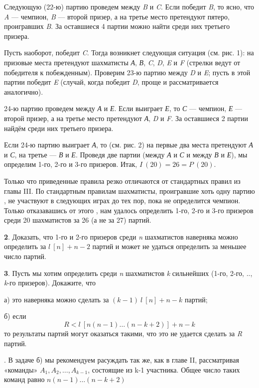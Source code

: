 \begin{paracol}{2}
{Следующую (22-ю) партию проведем между \textit{B} и \textit{C}. Если победит \textit{B}, то ясно, что \textit{A} --- чемпион, \textit{B} --- второй призер, а на третье место претендуют пятеро, проигравших \textit{B}. За оставшиеся 4 партии можно найти среди них третьего призера. 

\switchcolumn

Пусть наоборот, победит \textit{C}. Тогда возникнет следующая ситуация (см. рис. 1): на призовые места претендуют шахматисты \textit{А}, \textit{В}, \textit{C}, \textit{D}, \textit{E} и \textit{F} (стрелки ведут от победителя к побежденным). Проверим 23-ю партию между \textit{D} и \textit{E}; пусть в этой партии победит \textit{E} (случай, когда победит \textit{D}, проще и рассматривается аналогично).

24-ю партию проведем между \textit{А} и \textit{Е}. Если выиграет \textit{Е}, то \textit{С} --- чемпион, \textit{Е} --- второй призер, а на третье место претендуют \textit{А}, \textit{D} и \textit{F}. За оставшиеся 2 партии найдём среди них третьего призера.

Если 24-ю партию выиграет \textit{А}, то (см. рис. 2) на первые два места претендуют \textit{А} и \textit{С}, на третье --- \textit{В} и \textit{Е}. Проведя две партии (между \textit{А} и \textit{С} и между \textit{В} и \textit{Е}), мы определим 1-го, 2-го и 3-го призеров. Итак, $I \ (20)=26=P \ (20)$.

Только что приведенные правила резко отличаются от стандартных правил из главы III. По стандартным правилам шахматисты, проигравшие хоть одну партию , не участвуют в следующих играх до тех пор, пока не определится чемпион. Только отказавашись от этого , нам удалось определить 1-го, 2-го и 3-го призеров среди 20 шахматистов за 26 (а не за 27) партий.

\textbf{2}. Доказать, что 1-го и 2-го призеров среди \textit{n} шахматистов наверняка можно определить за $l \ [n] + n - 2$ партий и может не удаться определить за меньшее число партий.

\textbf{3}. Пусть мы хотим определить среди \textit{n} шахматистов \textit{k} сильнейших (1-го, 2-го, .., \textit{k}-го призеров). Докажите, что 

а) это наверняка можно сделать за $(k - 1) \ l \ [n] + n - k$ партий;

б) если
\[
R<l \ [n(n-1)\dots(n-k+2)]+n-k
\]
то результаты партий могут оказаться такими, что это не удается сделать за \textit{R} партий.

. В задаче б) мы рекомендуем расуждать так же, как в главе II, рассматривая «команды» $A_1, A_2,\dots, A_{k-1}$, состоящие из k-1 участника. Общее число таких команд равно $n(n-1)\dots(n-k+2)$
}
\end{paracol}